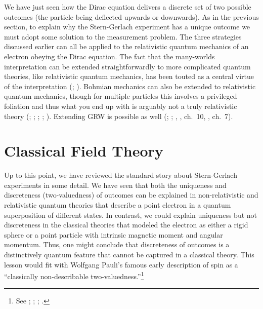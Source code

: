 \documentclass[onecolumn,secnumarabic,amsmath,amssymb,balancelastpage,nofootinbib]{article}
\begin{document}
We have just seen how the Dirac equation delivers a discrete set of two possible outcomes (the particle being deflected upwards or downwards).  As in the previous section, to explain why the Stern-Gerlach experiment has a unique outcome we must adopt some solution to the measurement problem.  The three strategies discussed earlier can all be applied to the relativistic quantum mechanics of an electron obeying the Dirac equation.  The fact that the many-worlds interpretation can be extended straightforwardly to more complicated quantum theories, like relativistic quantum mechanics, has been touted as a central virtue of the interpretation (\citealp[sec.\ 1.7]{wallaceQM}; \citealp{wallace2020}).  Bohmian mechanics can also be extended to relativistic quantum mechanics, though for multiple particles this involves a privileged foliation and thus what you end up with is arguably not a truly relativistic theory (\citealp{bohm1953}; \citealp[ch.\ 12]{bohmhiley}; \citealp[sec.\ 12.2]{holland}; \citealp{durr2014}; \citealp[sec.\ 3.1]{tumulka2018}).  Extending GRW is possible as well (\citealp{tumulka2006}; \citealp{bedingham2014}; \citeauthor{maudlin2011}, \citeyear{maudlin2011}, ch.\ 10, \citeyear{maudlinQM}, ch.\ 7).












\section{Classical Field Theory}\label{cftsection}

Up to this point, we have reviewed the standard story about Stern-Gerlach experiments in some detail.  We have seen that both the uniqueness and discreteness (two-valuedness) of outcomes can be explained in non-relativistic and relativistic quantum theories that describe a point electron in a quantum superposition of different states.  In contrast, we could explain uniqueness but not discreteness in the classical theories that modeled the electron as either a rigid sphere or a point particle with intrinsic magnetic moment and angular momentum.  Thus, one might conclude that discreteness of outcomes is a distinctively quantum feature that cannot be captured in a classical theory.  This lesson would fit with Wolfgang Pauli's famous early description of spin as a ``classically non-describable two-valuedness.''\footnote{See \citet{pauli1925, pauli1946}; \citet[ch.\ 2]{tomonaga1997}; \citet{morrison2007, giulini2008}; \citet[sec.\ 7.4]{deregt}.}
\end{document}

